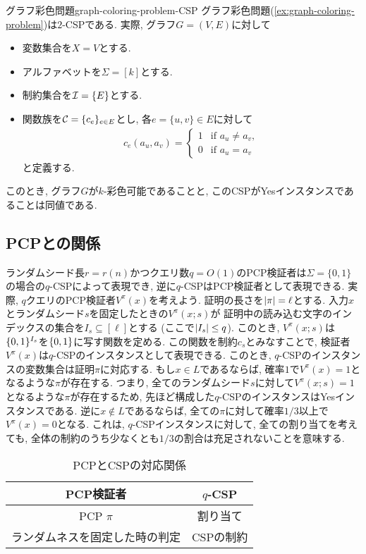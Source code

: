 \begin{example}{グラフ彩色問題}{graph-coloring-problem-CSP}
  グラフ彩色問題(\cref{ex:graph-coloring-problem})は$2$-CSPである.
  実際, グラフ$G=(V,E)$に対して
  \begin{itemize}
    \item 変数集合を$X=V$とする.
    \item アルファベットを$\Sigma=[k]$とする.
    \item 制約集合を$\mathcal{I}=\{E\}$とする.
    \item 関数族を$\mathcal{C}=\{c_e\}_{e\in E}$とし, 各$e=\{u,v\}\in E$に対して
    \begin{align*}
      c_e(a_u,a_v) = \begin{cases}
        1 & \text{if } a_u\neq a_v, \\
        0 & \text{if } a_u=a_v
      \end{cases}
    \end{align*}
    と定義する.
  \end{itemize}
  このとき, グラフ$G$が$k$-彩色可能であることと, このCSPがYesインスタンスであることは同値である.
\end{example}


\subsection{PCPとの関係}
ランダムシード長$r=r(n)$かつクエリ数$q=O(1)$のPCP検証者は$\Sigma=\{0,1\}$の場合の$q$-CSPによって表現でき, 逆に$q$-CSPはPCP検証者として表現できる.
実際, $q$クエリのPCP検証者$V^\pi(x)$を考えよう.
証明の長さを$\abs{\pi}=\ell$とする.
入力$x$とランダムシード$s$を固定したときの$V^\pi(x;s)$が
証明中の読み込む文字のインデックスの集合を$I_s\subseteq[\ell]$とする (ここで$\abs{I_s}\le q$).
このとき, $V^\pi(x;s)$は$\{0,1\}^{I_s}$を$\{0,1\}$に写す関数を定める.
この関数を制約$c_s$とみなすことで, 検証者$V^\pi(x)$は$q$-CSPのインスタンスとして表現できる.
このとき, $q$-CSPのインスタンスの変数集合は証明$\pi$に対応する.
もし$x\in L$であるならば, 確率$1$で$V^\pi(x)=1$となるような$\pi$が存在する.
つまり, 全てのランダムシード$s$に対して$V^\pi(x;s)=1$となるような$\pi$が存在するため,
先ほど構成した$q$-CSPのインスタンスはYesインスタンスである.
逆に$x\not\in L$であるならば, 全ての$\pi$に対して確率$1/3$以上で$V^\pi(x)=0$となる.
これは, $q$-CSPインスタンスに対して, 全ての割り当てを考えても, 全体の制約のうち少なくとも$1/3$の割合は充足されないことを意味する.


\begin{table}[htbp]
  \centering
  \begin{tabular}{|c|c|}
    \hline
    PCP検証者 & $q$-CSP \\
    \hline
    PCP $\pi$ & 割り当て \\
    \hline
    ランダムネスを固定した時の判定 & CSPの制約 \\
    \hline
  \end{tabular}
  \caption{PCPとCSPの対応関係}
  \label{table:pcp-csp-correspondence}
\end{table}


